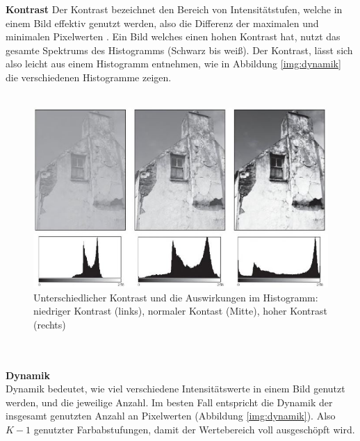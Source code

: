 \textbf{Kontrast}\label{s.kontrast}
Der Kontrast bezeichnet den Bereich von Intensitätstufen, welche in einem Bild effektiv genutzt werden, also die Differenz der maximalen und minimalen Pixelwerten \cite[44]{burger2009digitale}. Ein Bild welches einen hohen Kontrast hat, nutzt das gesamte Spektrums des Histogramms (Schwarz bis weiß). Der Kontrast, lässt sich also leicht aus einem Histogramm entnehmen, wie in Abbildung \ref{img:dynamik} die verschiedenen Histogramme zeigen.\\\\
  \begin{figure}
    [h]
    \centering
    \includegraphics[scale=0.7]{Sources/kontrast.JPG}
    \caption{Unterschiedlicher Kontrast und die Auswirkungen im Histogramm: niedriger Kontrast (links), normaler Kontast (Mitte), hoher Kontrast (rechts)\cite[45]{burger2009digitale}}
    \label{img:kontrast}
  \end{figure}\\\\
\textbf{Dynamik}\label{s.dynamik}\\
Dynamik bedeutet, wie viel verschiedene Intensitätswerte in einem Bild genutzt werden, und die jeweilige Anzahl\cite[44]{burger2009digitale}. Im besten Fall entspricht die Dynamik der insgesamt genutzten Anzahl an Pixelwerten (Abbildung \ref{img:dynamik}). Also $K-1$ genutzter Farbabstufungen, damit der Wertebereich voll ausgeschöpft wird.\\
